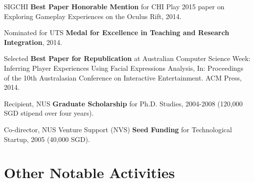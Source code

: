 \documentclass[10pt,a4paper]{article}
\renewenvironment{itemize}{
    \begin{list}{}{
            \setlength{\leftmargin}{1.5em}
            \setlength{\itemsep}{0.25em}
            \setlength{\parskip}{0pt}
            \setlength{\parsep}{0.25em}
        }
        }{
    \end{list}
}
\begin{document}
\begin{itemize}
    \item SIGCHI \textbf{Best Paper Honorable Mention} for CHI Play 2015 paper on Exploring Gameplay Experiences on the Oculus Rift, 2014.

    \item Nominated for UTS \textbf{Medal for Excellence in Teaching and Research Integration}, 2014.

    \item Selected \textbf{Best Paper for Republication} at Australian Computer Science Week: Inferring Player Experiences Using Facial Expressions Analysis, In: Proceedings of the 10th Australasian Conference on Interactive Entertainment. ACM Press, 2014.

    \item Recipient, NUS \textbf{Graduate Scholarship} for Ph.D. Studies,
        2004-2008 (120,000 SGD stipend over four years).

    \item Co-director, NUS Venture Support (NVS) \textbf{Seed Funding} for Technological Startup,
        2005 (40,000 SGD).
\end{itemize}



\section*{Other Notable Activities}
\end{document}
